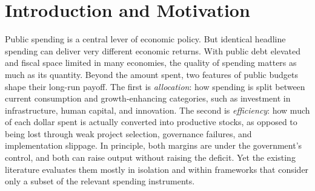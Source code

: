 \documentclass[a4paper,11pt]{article}
\begin{document}
\begin{abstract}

\clearpage
\pagebreak

\end{abstract}

\startcontents
{}

\thispagestyle{fancy}

\clearpage
\section{Introduction and Motivation}

Public spending is a central lever of economic policy.
But identical headline spending can deliver very different economic returns.
With public debt elevated and fiscal space limited in many economies, the quality of spending matters as much as its quantity.
Beyond the amount spent, two features of public budgets shape their long-run payoff.
The first is \emph{allocation}: how spending is split between current consumption and growth-enhancing categories, such as investment in infrastructure, human capital, and innovation.
The second is \emph{efficiency}: how much of each dollar spent is actually converted into productive stocks, as opposed to being lost through weak project selection, governance failures, and implementation slippage.
In principle, both margins are under the government's control, and both can raise output without raising the deficit.
Yet the existing literature evaluates them mostly in isolation and within frameworks that consider only a subset of the relevant spending instruments.
\end{document}

